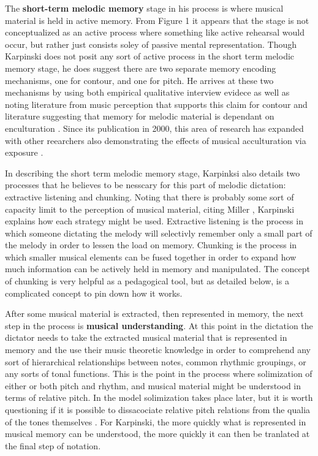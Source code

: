 \documentclass[]{book}
\theoremstyle{definition}
\theoremstyle{definition}
\theoremstyle{definition}
\theoremstyle{remark}
\begin{document}
The \textbf{short-term melodic memory} stage in his process is where
musical material is held in active memory. From Figure 1 it appears that
the stage is not conceptualized as an active process where something
like active rehearsal would occur, but rather just consists soley of
passive mental representation. Though Karpinski does not posit any sort
of active process in the short term melodic memory stage, he does
suggest there are two separate memory encoding mechanisms, one for
contour, and one for pitch. He arrives at these two mechanisms by using
both empirical qualitative interview evidece as well as noting
literature from music perception that supports this claim for contour
\citep{dowlingScaleContourTwo1978, dewittRecognitionNovelMelodies1986}
and literature suggesting that memory for melodic material is dependant
on enculturation
\citep{ouraMemoryMelodiesSubjects1988, handelListeningIntroductionPerception1989, dowlingExpectancyAttentionMelody1990}.
Since its publication in 2000, this area of research has expanded with
other reearchers also demonstrating the effects of musical acculturation
via exposure
\citep{eerolaExpectancySamiYoiks2009, stevensMusicPerceptionCognition2012, pearceAuditoryExpectationInformation2012}.

In describing the short term melodic memory stage, Karpinksi also
details two processes that he believes to be nesscary for this part of
melodic dictation: extractive listening and chunking. Noting that there
is probably some sort of capacity limit to the perception of musical
material, citing Miller \citeyearpar{millerMagicalNumberSeven1956},
Karpinski explains how each strategy might be used. Extractive listening
is the process in which someone dictating the melody will selectivly
remember only a small part of the melody in order to lessen the load on
memory. Chunking is the process in which smaller musical elements can be
fused together in order to expand how much information can be actively
held in memory and manipulated. The concept of chunking is very helpful
as a pedagogical tool, but as detailed below, is a complicated concept
to pin down how it works.

After some musical material is extracted, then represented in memory,
the next step in the process is \textbf{musical understanding}. At this
point in the dictation the dictator needs to take the extracted musical
material that is represented in memory and the use their music theoretic
knowledge in order to comprehend any sort of hierarchical relationships
between notes, common rhythmic groupings, or any sorts of tonal
functions. This is the point in the process where solimization of either
or both pitch and rhythm, and musical material might be understood in
terms of relative pitch. In the model solimization takes place later,
but it is worth questioning if it is possible to dissacociate relative
pitch relations from the qualia of the tones themselves
\citep{arthurPerceptualStudyScaledegree2018}. For Karpinski, the more
quickly what is represented in musical memory can be understood, the
more quickly it can then be tranlated at the final step of notation.
\end{document}
